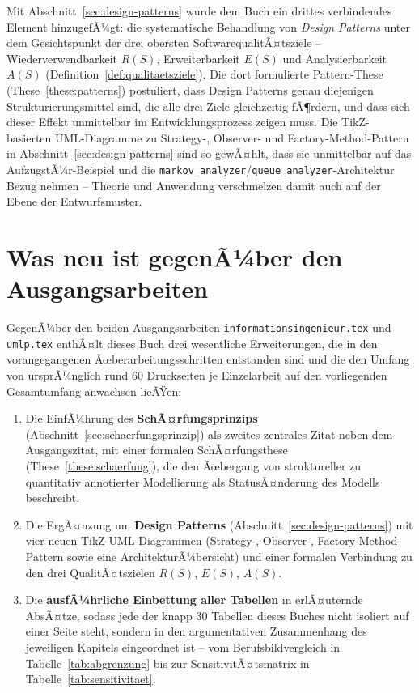 ﻿\documentclass[a4paper,12pt]{report}
\theoremstyle{definition}
\begin{document}
Mit Abschnitt~\ref{sec:design-patterns} wurde dem Buch ein drittes
verbindendes Element hinzugefÃ¼gt: die systematische Behandlung von
\emph{Design Patterns} unter dem Gesichtspunkt der drei obersten
SoftwarequalitÃ¤tsziele -- Wiederverwendbarkeit $R(S)$, Erweiterbarkeit
$E(S)$ und Analysierbarkeit $A(S)$ (Definition~\ref{def:qualitaetsziele}).
Die dort formulierte Pattern-These (These~\ref{these:patterns}) postuliert,
dass Design Patterns genau diejenigen Strukturierungsmittel sind, die alle
drei Ziele gleichzeitig fÃ¶rdern, und dass sich dieser Effekt unmittelbar im
Entwicklungsprozess zeigen muss. Die TikZ-basierten UML-Diagramme zu
Strategy-, Observer- und Factory-Method-Pattern in
Abschnitt~\ref{sec:design-patterns} sind so gewÃ¤hlt, dass sie unmittelbar
auf das AufzugstÃ¼r-Beispiel und die \texttt{markov\_analyzer}/\texttt{queue\_analyzer}-Architektur
Bezug nehmen -- Theorie und Anwendung verschmelzen damit auch auf der Ebene
der Entwurfsmuster.

\section*{Was neu ist gegenÃ¼ber den Ausgangsarbeiten}

GegenÃ¼ber den beiden Ausgangsarbeiten \texttt{informationsingenieur.tex}
und \texttt{umlp.tex} enthÃ¤lt dieses Buch drei wesentliche Erweiterungen,
die in den vorangegangenen Ãœberarbeitungsschritten entstanden sind und die
den Umfang von ursprÃ¼nglich rund 60 Druckseiten je Einzelarbeit auf den
vorliegenden Gesamtumfang anwachsen lieÃŸen:

\begin{enumerate}
  \item[(1)] Die EinfÃ¼hrung des \textbf{SchÃ¤rfungsprinzips}
  (Abschnitt~\ref{sec:schaerfungsprinzip}) als zweites zentrales Zitat neben
  dem Ausgangszitat, mit einer formalen SchÃ¤rfungsthese
  (These~\ref{these:schaerfung}), die den Ãœbergang von struktureller zu
  quantitativ annotierter Modellierung als StatusÃ¤nderung des Modells
  beschreibt.

  \item[(2)] Die ErgÃ¤nzung um \textbf{Design Patterns}
  (Abschnitt~\ref{sec:design-patterns}) mit vier neuen TikZ-UML-Diagrammen
  (Strategy-, Observer-, Factory-Method-Pattern sowie eine
  ArchitekturÃ¼bersicht) und einer formalen Verbindung zu den drei
  QualitÃ¤tszielen $R(S)$, $E(S)$, $A(S)$.

  \item[(3)] Die \textbf{ausfÃ¼hrliche Einbettung aller Tabellen} in
  erlÃ¤uternde AbsÃ¤tze, sodass jede der knapp 30 Tabellen dieses Buches nicht
  isoliert auf einer Seite steht, sondern in den argumentativen
  Zusammenhang des jeweiligen Kapitels eingeordnet ist -- vom
  Berufsbildvergleich in Tabelle~\ref{tab:abgrenzung} bis zur
  SensitivitÃ¤tsmatrix in Tabelle~\ref{tab:sensitivitaet}.
\end{enumerate}
\end{document}

